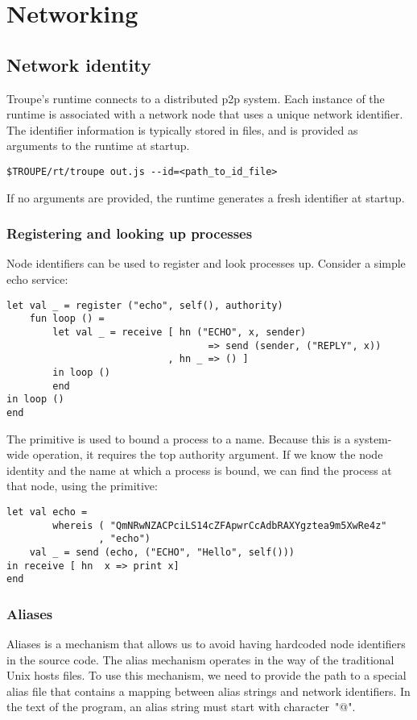 \section{Networking}
\label{sec:network}

\subsection{Network identity}
Troupe's runtime connects to a distributed p2p system. 
Each instance of the runtime is associated with a network node that uses a
unique network identifier. The identifier information is typically stored in files,
and is provided as arguments to the runtime at startup.
\begin{verbatim}
$TROUPE/rt/troupe out.js --id=<path_to_id_file>    
\end{verbatim}
If no arguments are provided, the runtime generates a fresh identifier at startup.


\subsubsection{Registering and looking up processes}

Node identifiers can be used to register and look processes up.
Consider a simple echo service:
\label{example:echo}
\begin{lstlisting}
let val _ = register ("echo", self(), authority)
    fun loop () =
        let val _ = receive [ hn ("ECHO", x, sender) 
                                   => send (sender, ("REPLY", x))
                            , hn _ => () ]
        in loop ()
        end
in loop ()
end
\end{lstlisting}
The  primitive is used to bound a process to a name. Because this is a
system-wide operation, it requires the top authority argument.  If we know 
the node identity and the name at which a process is bound, we can find the process at that node, using the 
 primitive:


\begin{lstlisting}
let val echo = 
        whereis ( "QmNRwNZACPciLS14cZFApwrCcAdbRAXYgztea9m5XwRe4z"
                , "echo")
    val _ = send (echo, ("ECHO", "Hello", self()))
in receive [ hn  x => print x]
end    
\end{lstlisting}

\subsubsection{Aliases}
Aliases is a mechanism that allows us to avoid having hardcoded node identifiers in the source code. 
The alias mechanism operates in the way of the traditional Unix hosts files.
To use this mechanism, we need to provide the path to a special alias file that contains a mapping between
alias strings and network identifiers. In the text of the program, an alias string must start with character~"@".


